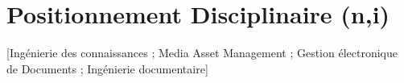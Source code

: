 


\section{Positionnement Disciplinaire (n,i)}\label{sec:posd}
[Ingénierie des connaissances ; Media Asset Management ; Gestion électronique de Documents ; Ingénierie documentaire]


